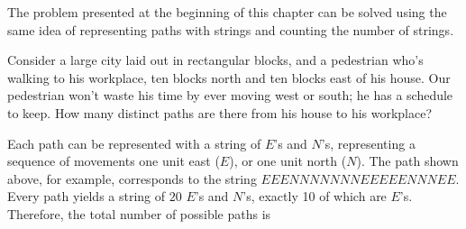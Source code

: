 \par
The problem presented at the beginning of this chapter can be solved using the same idea of representing paths with strings and counting the number of strings.

\begin{examp}Consider a large city laid out in rectangular blocks, and a pedestrian who's walking to his workplace, ten blocks north and ten blocks east of his house. Our pedestrian won't waste his time by ever moving west or south; he has a schedule to keep. How many distinct paths are there from his house to his workplace?

\begin{center}
\end{center}

\par
\noindent Each path can be represented with a string of $E$'s and $N$'s, representing a sequence of movements one unit east ($E$), or one unit north ($N$). The path shown above, for example, corresponds to the string $EEENNNNNNNEEEEENNNEE$. Every path yields a string of $20$ $E$'s and $N$'s, exactly 10 of which are $E$'s. Therefore, the total number of possible paths is

\end{examp}

